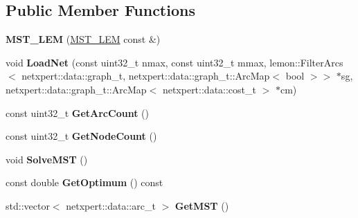 \subsection*{Public Member Functions}
\begin{DoxyCompactItemize}
\item 
{\bfseries M\+S\+T\+\_\+\+L\+EM} (\hyperlink{classnetxpert_1_1core_1_1MST__LEM}{M\+S\+T\+\_\+\+L\+EM} const \&)\hypertarget{classnetxpert_1_1core_1_1MST__LEM_abdd5584b9ac0cfbf68ea3053fab84875}{}\label{classnetxpert_1_1core_1_1MST__LEM_abdd5584b9ac0cfbf68ea3053fab84875}

\item 
void {\bfseries Load\+Net} (const uint32\+\_\+t nmax, const uint32\+\_\+t mmax, lemon\+::\+Filter\+Arcs$<$ netxpert\+::data\+::graph\+\_\+t, netxpert\+::data\+::graph\+\_\+t\+::\+Arc\+Map$<$ bool $>$$>$ $\ast$sg, netxpert\+::data\+::graph\+\_\+t\+::\+Arc\+Map$<$ netxpert\+::data\+::cost\+\_\+t $>$ $\ast$cm)\hypertarget{classnetxpert_1_1core_1_1MST__LEM_a5dc785d80fa6ee78d798dbb3f9e61355}{}\label{classnetxpert_1_1core_1_1MST__LEM_a5dc785d80fa6ee78d798dbb3f9e61355}

\item 
const uint32\+\_\+t {\bfseries Get\+Arc\+Count} ()\hypertarget{classnetxpert_1_1core_1_1MST__LEM_a97f75745010d6f4f21f602b59cde87b4}{}\label{classnetxpert_1_1core_1_1MST__LEM_a97f75745010d6f4f21f602b59cde87b4}

\item 
const uint32\+\_\+t {\bfseries Get\+Node\+Count} ()\hypertarget{classnetxpert_1_1core_1_1MST__LEM_a7a3348f7565087a86f156bdd889c6ec8}{}\label{classnetxpert_1_1core_1_1MST__LEM_a7a3348f7565087a86f156bdd889c6ec8}

\item 
void {\bfseries Solve\+M\+ST} ()\hypertarget{classnetxpert_1_1core_1_1MST__LEM_a3aa993c7a865803f7222e7c8d76893e9}{}\label{classnetxpert_1_1core_1_1MST__LEM_a3aa993c7a865803f7222e7c8d76893e9}

\item 
const double {\bfseries Get\+Optimum} () const \hypertarget{classnetxpert_1_1core_1_1MST__LEM_a73b7fa80fae50c424dea2022f45f6ee8}{}\label{classnetxpert_1_1core_1_1MST__LEM_a73b7fa80fae50c424dea2022f45f6ee8}

\item 
std\+::vector$<$ netxpert\+::data\+::arc\+\_\+t $>$ {\bfseries Get\+M\+ST} ()\hypertarget{classnetxpert_1_1core_1_1MST__LEM_afaedc6059124fd068f6db625cc691a32}{}\label{classnetxpert_1_1core_1_1MST__LEM_afaedc6059124fd068f6db625cc691a32}

\end{DoxyCompactItemize}
